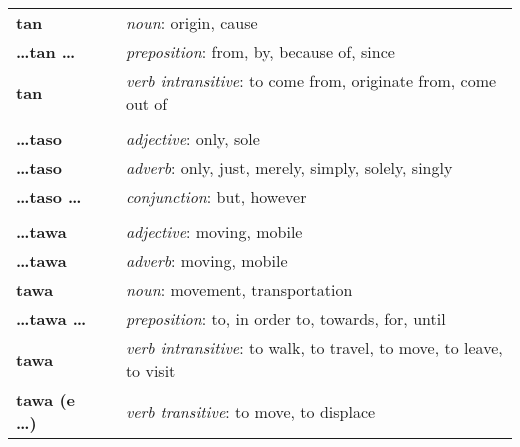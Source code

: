 \begin{supertabular}{p{2,5cm}|ll}
    \textbf{tan}                 &  & \textit{noun}: origin, cause                                                                               \\
    \textbf{\dots tan \dots}     &  & \textit{preposition}: from, by, because of, since                                                          \\
    \textbf{tan}                 &  & \textit{verb intransitive}: to come from, originate from, come out of                                      \\
                                 &  &                                                                                                            \\
    \textbf{\dots taso}          &  & \textit{adjective}: only, sole                                                                             \\
    \textbf{\dots taso}          &  & \textit{adverb}: only, just, merely, simply, solely, singly                                                \\
    \textbf{\dots taso \dots}    &  & \textit{conjunction}: but, however                                                                         \\
                                 &  &                                                                                                            \\
    \textbf{\dots tawa}          &  & \textit{adjective}: moving, mobile                                                                         \\
    \textbf{\dots tawa}          &  & \textit{adverb}: moving, mobile                                                                            \\
    \textbf{tawa}                &  & \textit{noun}: movement, transportation                                                                    \\
    \textbf{\dots tawa \dots}    &  & \textit{preposition}: to, in order to, towards, for, until                                                 \\
    \textbf{tawa}                &  & \textit{verb intransitive}: to walk, to travel, to move, to leave, to visit                                \\
    \textbf{tawa (e \dots)}      &  & \textit{verb transitive}: to move, to displace                                                             \\

\end{supertabular}
